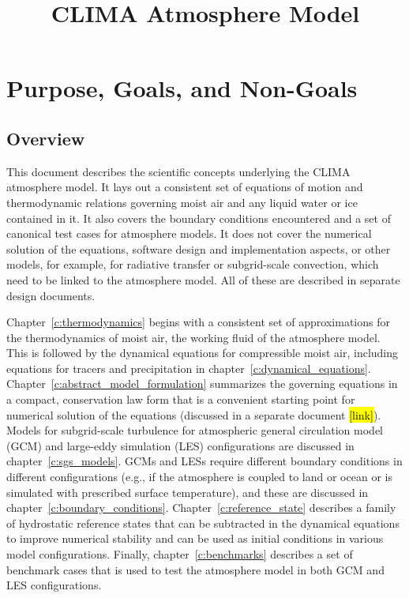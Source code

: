 \documentclass{report}
\title{CLIMA Atmosphere Model}
\author{ }
\begin{document}
\maketitle
\tableofcontents

\chapter{Purpose, Goals, and Non-Goals}

\section{Overview}

This document describes the scientific concepts underlying the CLIMA atmosphere model. It lays out a consistent set of equations of motion and thermodynamic relations governing moist air and any liquid water or ice contained in it. It also covers the boundary conditions encountered and a set of canonical test cases for atmosphere models. It does not cover the numerical solution of the equations, software design and implementation aspects, or other models, for example, for radiative transfer or subgrid-scale convection, which need to be linked to the atmosphere model. All of these are described in separate design documents. 

Chapter~\ref{c:thermodynamics} begins with a consistent set of approximations for the thermodynamics of moist air, the working fluid of the atmosphere model. This is followed by the dynamical equations for compressible moist air, including equations for tracers and precipitation in chapter~\ref{c:dynamical_equations}. Chapter~\ref{c:abstract_model_formulation} summarizes the governing equations in a compact, conservation law form that is a convenient starting point for numerical solution of the equations (discussed in a separate document \hl{[link]}). Models for subgrid-scale turbulence for atmospheric general circulation model (GCM) and large-eddy simulation (LES) configurations are discussed in chapter~\ref{c:sgs_models}. GCMs and LESs require different boundary conditions in different configurations (e.g., if the atmosphere is coupled to land or ocean or is simulated with prescribed surface temperature), and these are discussed in chapter~\ref{c:boundary_conditions}. Chapter~\ref{c:reference_state} describes a family of hydrostatic reference states that can be subtracted in the dynamical equations to improve numerical stability and can be used as initial conditions in various model configurations. Finally, chapter~\ref{c:benchmarks} describes a set of benchmark cases that is used to test the atmosphere model in both GCM and LES configurations. 
\end{document}
